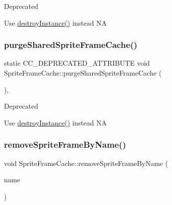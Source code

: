 \begin{DoxyRefDesc}{Deprecated}
\item[\hyperlink{deprecated__deprecated000045}{Deprecated}]Use \hyperlink{classSpriteFrameCache_af23cb4be28289ff0cf3d5e88afe56046}{destroy\+Instance()} instead  NA \end{DoxyRefDesc}
\mbox{\label{classSpriteFrameCache_a56768e2b3b8574dbe135862684548562}} 
\subsubsection{\texorpdfstring{purge\+Shared\+Sprite\+Frame\+Cache()}{purgeSharedSpriteFrameCache()}\hspace{0.1cm}{\footnotesize\ttfamily [2/2]}}
{\footnotesize\ttfamily static C\+C\+\_\+\+D\+E\+P\+R\+E\+C\+A\+T\+E\+D\+\_\+\+A\+T\+T\+R\+I\+B\+U\+TE void Sprite\+Frame\+Cache\+::purge\+Shared\+Sprite\+Frame\+Cache (\begin{DoxyParamCaption}{ }\end{DoxyParamCaption})\hspace{0.3cm}{\ttfamily [inline]}, {\ttfamily [static]}}

\begin{DoxyRefDesc}{Deprecated}
\item[\hyperlink{deprecated__deprecated000277}{Deprecated}]Use \hyperlink{classSpriteFrameCache_af23cb4be28289ff0cf3d5e88afe56046}{destroy\+Instance()} instead  NA \end{DoxyRefDesc}
\mbox{\label{classSpriteFrameCache_a970b7aba25986a18fe2353bf1e587f44}} 
\subsubsection{\texorpdfstring{remove\+Sprite\+Frame\+By\+Name()}{removeSpriteFrameByName()}\hspace{0.1cm}{\footnotesize\ttfamily [1/2]}}
{\footnotesize\ttfamily void Sprite\+Frame\+Cache\+::remove\+Sprite\+Frame\+By\+Name (\begin{DoxyParamCaption}\item[{const std\+::string \&}]{name }\end{DoxyParamCaption})}

